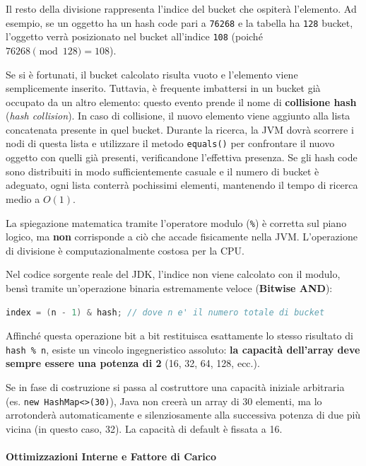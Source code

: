 Il resto della divisione rappresenta l'indice del bucket che ospiterà l'elemento. Ad esempio, se un oggetto ha un hash code pari a \texttt{76268} e la tabella ha \texttt{128} bucket, l'oggetto verrà posizionato nel bucket all'indice \texttt{108} (poiché $76268 \pmod{128} = 108$).

Se si è fortunati, il bucket calcolato risulta vuoto e l'elemento viene semplicemente inserito. Tuttavia, è frequente imbattersi in un bucket già occupato da un altro elemento: questo evento prende il nome di \textbf{collisione hash} (\textit{hash collision}). 
In caso di collisione, il nuovo elemento viene aggiunto alla lista concatenata presente in quel bucket. Durante la ricerca, la JVM dovrà scorrere i nodi di questa lista e utilizzare il metodo \texttt{equals()} per confrontare il nuovo oggetto con quelli già presenti, verificandone l'effettiva presenza. Se gli hash code sono distribuiti in modo sufficientemente casuale e il numero di bucket è adeguato, ogni lista conterrà pochissimi elementi, mantenendo il tempo di ricerca medio a $O(1)$.

\begin{dettagli}
La spiegazione matematica tramite l'operatore modulo (\texttt{\%}) è corretta sul piano logico, ma \textbf{non} corrisponde a ciò che accade fisicamente nella JVM. L'operazione di divisione è computazionalmente costosa per la CPU. 

Nel codice sorgente reale del JDK, l'indice non viene calcolato con il modulo, bensì tramite un'operazione binaria estremamente veloce (\textbf{Bitwise AND}):
\begin{lstlisting}[language=Java]
index = (n - 1) & hash; // dove n e' il numero totale di bucket
\end{lstlisting}

Affinché questa operazione bit a bit restituisca esattamente lo stesso risultato di \texttt{hash \% n}, esiste un vincolo ingegneristico assoluto: \textbf{la capacità dell'array deve sempre essere una potenza di 2} (16, 32, 64, 128, ecc.). 

Se in fase di costruzione si passa al costruttore una capacità iniziale arbitraria (es. \texttt{new HashMap<>(30)}), Java non creerà un array di 30 elementi, ma lo arrotonderà automaticamente e silenziosamente alla successiva potenza di due più vicina (in questo caso, 32). La capacità di default è fissata a 16. 
\end{dettagli}

\paragraph{Ottimizzazioni Interne e Fattore di Carico}

